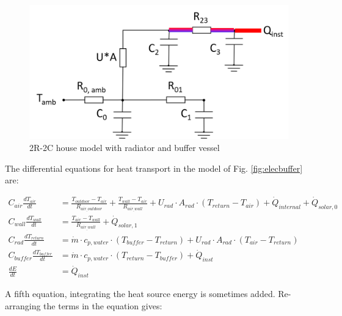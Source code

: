 \begin{figure}[H]
	\centering
	\includegraphics[width=0.7\columnwidth]{Figures/buffervessel.png}
	\caption[Short title]{2R-2C house model with radiator and buffer vessel}
	\label{fig:buffervessel}
\end{figure} 

The differential equations for heat transport in the model of Fig. \ref{fig:elecbuffer} are:

\begin{equation}
	\begin{aligned}
	    C_{air} \frac{dT_{air}}{dt} &= \frac{T_{outdoor}-T_{air}}{R_{air_{\_}outdoor}} + \frac{T_{wall}-T_{air}}{R_{air_{\_}wall}} + U_{rad} \cdot A_{rad} \cdot (T_{return} - T_{air}) + \dot{Q}_{internal} + \dot{Q}_{solar, 0} \\
	    C_{wall} \frac{dT_{wall}}{dt} &= \frac{T_{air}-T_{wall}}{R_{air_{\_}wall}} + \dot{Q}_{solar, 1} \\
	    C_{rad} \frac{dT_{return}}{dt} &= \dot{m} \cdot c_{p, water} \cdot (T_{buffer} - T_{return}) + U_{rad} \cdot A_{rad} \cdot (T_{air} - T_{return}) \\
		C_{buffer} \frac{dT_{buffer}}{dt} &= \dot{m} \cdot c_{p, water} \cdot ( T_{return} - T_{buffer} ) + \dot{Q}_{inst} \\
	    \frac{dE}{dt} &= \dot{Q}_{inst}
	\end{aligned}
\end{equation}

 A fifth equation, integrating the heat source energy is sometimes added. Re-arranging the terms in the equation gives:
 
